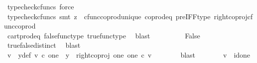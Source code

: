 \begin{isabellebody}
\ {\isacharparenleft}{\kern0pt}typecheck{\isacharunderscore}{\kern0pt}cfuncs{\isacharcomma}{\kern0pt}\ force{\isacharparenright}{\kern0pt}\isanewline
\ \ \ \ \ \ \isamarkupfalse%
\ \isamarkupfalse%
\ {\isachardoublequoteopen}{\isasymlangle}{\isasymt}{\isacharcomma}{\kern0pt}\ {\isasymt}{\isasymrangle}\ {\isacharequal}{\kern0pt}\ {\isasymlangle}{\isasymf}{\isacharcomma}{\kern0pt}\ {\isasymf}{\isasymrangle}{\isachardoublequoteclose}\isanewline
\ \ \ \ \ \ \ \ \isamarkupfalse%
\ {\isacharparenleft}{\kern0pt}typecheck{\isacharunderscore}{\kern0pt}cfuncs{\isacharcomma}{\kern0pt}\ smt\ {\isacharparenleft}{\kern0pt}z{}{\isacharparenright}{\kern0pt}\ \ cfunc{\isacharunderscore}{\kern0pt}coprod{\isacharunderscore}{\kern0pt}unique\ coprod{\isacharunderscore}{\kern0pt}eq{}\ pre{\isacharunderscore}{\kern0pt}IFF{\isacharunderscore}{\kern0pt}type\ right{\isacharunderscore}{\kern0pt}coproj{\isacharunderscore}{\kern0pt}cfunc{\isacharunderscore}{\kern0pt}coprod{\isacharparenright}{\kern0pt}\ \ \ \ \ \ \isanewline
\ \ \ \ \ \ \isamarkupfalse%
\ \isamarkupfalse%
\ {\isachardoublequoteopen}{\isasymt}\ {\isacharequal}{\kern0pt}\ {\isasymf}{\isachardoublequoteclose}\isanewline
\ \ \ \ \ \ \ \ \isamarkupfalse%
\ cart{\isacharunderscore}{\kern0pt}prod{\isacharunderscore}{\kern0pt}eq{}\ false{\isacharunderscore}{\kern0pt}func{\isacharunderscore}{\kern0pt}type\ true{\isacharunderscore}{\kern0pt}func{\isacharunderscore}{\kern0pt}type\ \isamarkupfalse%
\ blast\isanewline
\ \ \ \ \ \ \isamarkupfalse%
\ \isamarkupfalse%
\ False\isanewline
\ \ \ \ \ \ \ \ \isamarkupfalse%
\ true{\isacharunderscore}{\kern0pt}false{\isacharunderscore}{\kern0pt}distinct\ \isamarkupfalse%
\ blast\isanewline
\ \ \ \ \isamarkupfalse%
\isanewline
\ \ \ \ \isamarkupfalse%
\ \isamarkupfalse%
\ v\ \ y{\isacharunderscore}{\kern0pt}def{\isacharcolon}{\kern0pt}\ {\isachardoublequoteopen}v\ {\isasymin}\isactrlsub c\ one\ {\isasymand}\ y\ {\isacharequal}{\kern0pt}\ {\isacharparenleft}{\kern0pt}right{\isacharunderscore}{\kern0pt}coproj\ one\ one{\isacharparenright}{\kern0pt}\ {\isasymcirc}\isactrlsub c\ v{\isachardoublequoteclose}\isanewline
\ \ \ \ \ \ \isamarkupfalse%
\ blast\isanewline
\ \ \ \ \isamarkupfalse%
\ \isamarkupfalse%
\ {\isachardoublequoteopen}v\ {\isacharequal}{\kern0pt}\ id{\isacharparenleft}{\kern0pt}one{\isacharparenright}{\kern0pt}{\isachardoublequoteclose}\isanewline

\end{isabellebody}
